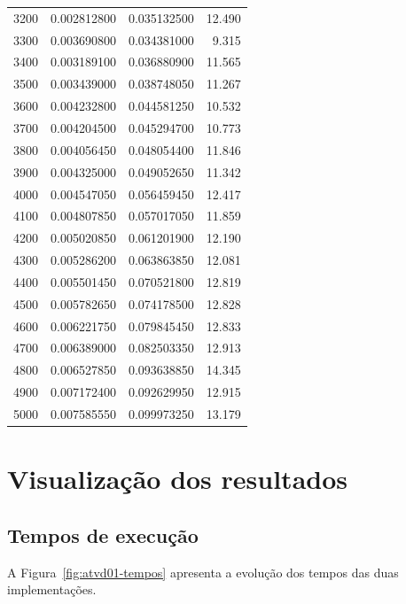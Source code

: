 \begin{longtable}{rrrr}
3200 & 0.002812800 & 0.035132500 & 12.490 \\
3300 & 0.003690800 & 0.034381000 & 9.315 \\
3400 & 0.003189100 & 0.036880900 & 11.565 \\
3500 & 0.003439000 & 0.038748050 & 11.267 \\
3600 & 0.004232800 & 0.044581250 & 10.532 \\
3700 & 0.004204500 & 0.045294700 & 10.773 \\
3800 & 0.004056450 & 0.048054400 & 11.846 \\
3900 & 0.004325000 & 0.049052650 & 11.342 \\
4000 & 0.004547050 & 0.056459450 & 12.417 \\
4100 & 0.004807850 & 0.057017050 & 11.859 \\
4200 & 0.005020850 & 0.061201900 & 12.190 \\
4300 & 0.005286200 & 0.063863850 & 12.081 \\
4400 & 0.005501450 & 0.070521800 & 12.819 \\
4500 & 0.005782650 & 0.074178500 & 12.828 \\
4600 & 0.006221750 & 0.079845450 & 12.833 \\
4700 & 0.006389000 & 0.082503350 & 12.913 \\
4800 & 0.006527850 & 0.093638850 & 14.345 \\
4900 & 0.007172400 & 0.092629950 & 12.915 \\
5000 & 0.007585550 & 0.099973250 & 13.179 \\

\end{longtable}

\normalsize



\section{Visualização dos resultados}

\label{sec:atvd01-visualizacao}

\subsection{Tempos de execução}

A Figura~\ref{fig:atvd01-tempos} apresenta a evolução dos tempos das duas
implementações.

